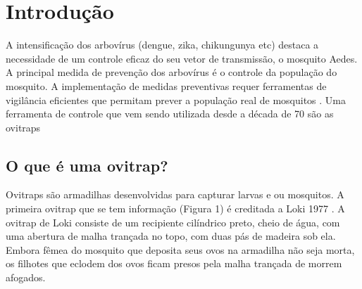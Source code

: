 \documentclass[
	12pt,				%
	openright,			%
	oneside,			%
	a4paper,			%
	chapter=TITLE,		%
	english,			%
	brazil				%
	]{abntex2}
\begin{document}

\tableofcontents*
\cleardoublepage



\textual

\setcounter{page}{12}

\chapter{Introdução}
A intensificação dos arbovírus (dengue, zika, chikungunya etc) destaca a necessidade de
um controle eficaz do seu vetor de transmissão, o mosquito Aedes. A principal
medida de prevenção dos arbovírus é o controle da população do mosquito. A
implementação de medidas preventivas requer ferramentas de vigilância eficientes que
permitam prever a população real de mosquitos \cite{ISMALIZA2019}. Uma ferramenta de controle que vem
sendo utilizada desde a década de 70 são as ovitraps \cite{LOK1977}

\section{O que é uma ovitrap?}

Ovitraps são armadilhas desenvolvidas para capturar larvas e ou mosquitos. A primeira ovitrap que se tem informação (Figura 1) é creditada a 
Loki 1977 \cite{LOK1977}. A ovitrap de Loki consiste de um recipiente cilíndrico preto, cheio de água,
com uma abertura de malha trançada no topo, com duas pás de madeira sob ela. Embora
fêmea do mosquito que deposita seus ovos na armadilha não seja morta, os filhotes que
eclodem dos ovos ficam presos pela malha trançada de morrem afogados.
\end{document}
